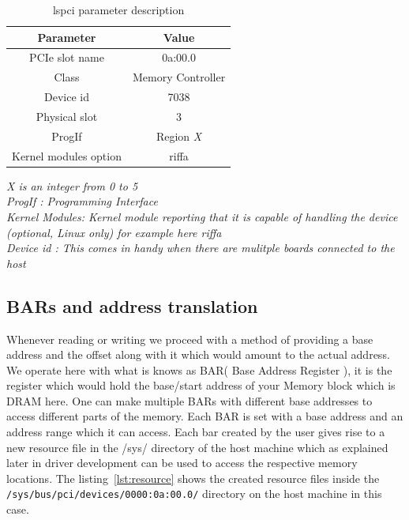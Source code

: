 \begin{table}[H]
\centering
\begin{tabular}{c | c}
\hline
Parameter & Value\\
\hline
PCIe slot name & 0a:00.0 \\
Class & Memory Controller\\
Device id & 7038 \\
Physical slot & 3 \\
ProgIf & Region \textit{X} \\
Kernel modules option & riffa
\end{tabular}
\caption{lspci parameter description}
\label{lspci parameters}
\end{table}

\normalsize
\doublespacing
\begin{flushleft}
\textit{X is an integer from 0 to 5\\}
\textit{ProgIf : Programming Interface\\}
\textit{Kernel Modules: Kernel module reporting that it is capable of handling the device (optional, Linux only) for example here riffa\\}
\textit{Device id : This comes in handy when there are mulitple boards connected to the host}
\end{flushleft}

\subsection{BARs and address translation}

Whenever reading or writing we proceed with a method of providing a base address and the offset along with it which would amount to the
actual address.  We operate here with what is knows as BAR( Base Address Register ), it is the register which would hold the base/start
address of your Memory block which is DRAM here. One can make multiple BARs with different base addresses to access different parts of the
memory. Each BAR is set with a base address and an address range which it can access. Each bar created by the user gives rise to a new
resource file in the /sys/ directory of the host machine which as explained later in driver development can be used to access the respective
memory locations. The listing~\ref{lst:resource} shows the created resource files inside the \verb|/sys/bus/pci/devices/0000:0a:00.0/|
directory on the host machine in this case.


